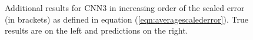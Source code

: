 \documentclass[12pt]{article}
\newcommand{\nhgappwidth}{0.24\linewidth}
\begin{document}
\begin{appendices}
\begin{figure}[!h]
\begin{subfigure}[c]{\nhgappwidth}
  \end{subfigure}
\caption{\label{fig:app3result} Additional results for CNN3 in increasing order of the scaled error (in brackets) as defined in equation (\ref{eqn:averagescalederror}). True results are on the left and predictions on the right.}  
\end{figure}
%
\end{appendices}
\clearpage
{}

\end{document}
